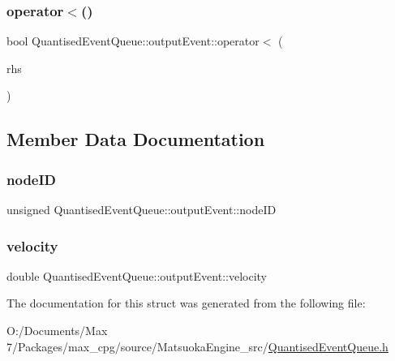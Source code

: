 \subsubsection{\texorpdfstring{operator$<$()}{operator<()}}
{\footnotesize\ttfamily bool Quantised\+Event\+Queue\+::output\+Event\+::operator$<$ (\begin{DoxyParamCaption}\item[{const \mbox{\hyperlink{structQuantisedEventQueue_1_1outputEvent}{output\+Event}} \&}]{rhs }\end{DoxyParamCaption})\hspace{0.3cm}{\ttfamily [inline]}}



\subsection{Member Data Documentation}
\mbox{\label{structQuantisedEventQueue_1_1outputEvent_a217eea923c7d29c3818a078ad49523f1}} 
\subsubsection{\texorpdfstring{node\+ID}{nodeID}}
{\footnotesize\ttfamily unsigned Quantised\+Event\+Queue\+::output\+Event\+::node\+ID}

\mbox{\label{structQuantisedEventQueue_1_1outputEvent_abcec0dd63fe3d2a68f070a7518096e39}} 
\subsubsection{\texorpdfstring{velocity}{velocity}}
{\footnotesize\ttfamily double Quantised\+Event\+Queue\+::output\+Event\+::velocity}



The documentation for this struct was generated from the following file\+:\begin{DoxyCompactItemize}
\item 
O\+:/\+Documents/\+Max 7/\+Packages/max\+\_\+cpg/source/\+Matsuoka\+Engine\+\_\+src/\mbox{\hyperlink{QuantisedEventQueue_8h}{Quantised\+Event\+Queue.\+h}}\end{DoxyCompactItemize}
